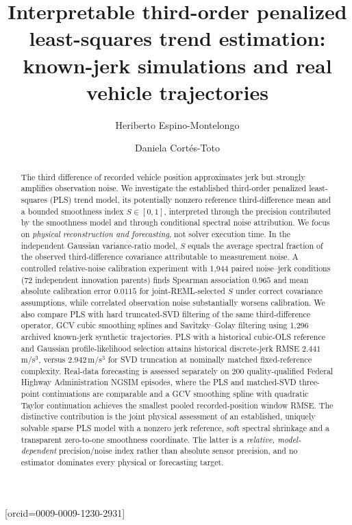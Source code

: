 \documentclass[a4paper,fleqn]{cas-dc}
\begin{document}
\let\WriteBookmarks\relax
\def\floatpagepagefraction{1}
\def\textpagefraction{.001}
\title[mode=title]{Interpretable third-order penalized least-squares trend estimation: known-jerk simulations and real vehicle trajectories}
\author[1]{Heriberto Espino-Montelongo}[orcid=0009-0009-1230-2931]
\author[1]{Daniela Cort\'es-Toto}
\begin{abstract}
The third difference of recorded vehicle position approximates jerk but strongly amplifies observation noise. We investigate the established third-order penalized least-squares (PLS) trend model, its potentially nonzero reference third-difference mean and a bounded smoothness index $S\in[0,1]$, interpreted through the precision contributed by the smoothness model and through conditional spectral noise attribution. We focus on \emph{physical reconstruction and forecasting}, not solver execution time. In the independent Gaussian variance-ratio model, $S$ equals the average spectral fraction of the observed third-difference covariance attributable to measurement noise. A controlled relative-noise calibration experiment with 1,944 paired noise--jerk conditions (72 independent innovation parents) finds Spearman association $0.965$ and mean absolute calibration error $0.0115$ for joint-REML-selected $S$ under correct covariance assumptions, while correlated observation noise substantially worsens calibration. We also compare PLS with hard truncated-SVD filtering of the same third-difference operator, GCV cubic smoothing splines and Savitzky--Golay filtering using 1,296 archived known-jerk synthetic trajectories. PLS with a historical cubic-OLS reference and Gaussian profile-likelihood selection attains historical discrete-jerk RMSE $2.441$\,m/s$^3$, versus $2.942$\,m/s$^3$ for SVD truncation at nominally matched fixed-reference complexity. Real-data forecasting is assessed separately on 200 quality-qualified Federal Highway Administration NGSIM episodes, where the PLS and matched-SVD three-point continuations are comparable and a GCV smoothing spline with quadratic Taylor continuation achieves the smallest pooled recorded-position window RMSE. The distinctive contribution is the joint physical assessment of an established, uniquely solvable sparse PLS model with a nonzero jerk reference, soft spectral shrinkage and a transparent zero-to-one smoothness coordinate. The latter is a \emph{relative, model-dependent} precision/noise index rather than absolute sensor precision, and no estimator dominates every physical or forecasting target.
\end{abstract}
\end{document}
